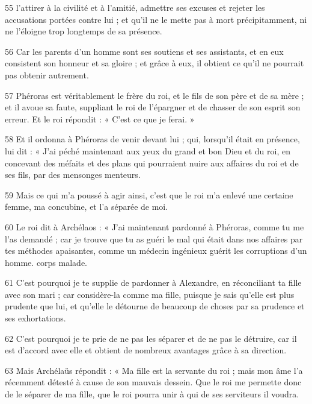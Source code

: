 \par 55 l'attirer à la civilité et à l'amitié, admettre ses excuses et rejeter les accusations portées contre lui ; et qu'il ne le mette pas à mort précipitamment, ni ne l'éloigne trop longtemps de sa présence.

\par 56 Car les parents d'un homme sont ses soutiens et ses assistants, et en eux consistent son honneur et sa gloire ; et grâce à eux, il obtient ce qu'il ne pourrait pas obtenir autrement.

\par 57 Phéroras est véritablement le frère du roi, et le fils de son père et de sa mère ; et il avoue sa faute, suppliant le roi de l'épargner et de chasser de son esprit son erreur. Et le roi répondit : « C'est ce que je ferai. »

\par 58 Et il ordonna à Phéroras de venir devant lui ; qui, lorsqu'il était en présence, lui dit : « J'ai péché maintenant aux yeux du grand et bon Dieu et du roi, en concevant des méfaits et des plans qui pourraient nuire aux affaires du roi et de ses fils, par des mensonges menteurs.

\par 59 Mais ce qui m'a poussé à agir ainsi, c'est que le roi m'a enlevé une certaine femme, ma concubine, et l'a séparée de moi.

\par 60 Le roi dit à Archélaos : « J'ai maintenant pardonné à Phéroras, comme tu me l'as demandé ; car je trouve que tu as guéri le mal qui était dans nos affaires par tes méthodes apaisantes, comme un médecin ingénieux guérit les corruptions d'un homme. corps malade.

\par 61 C'est pourquoi je te supplie de pardonner à Alexandre, en réconciliant ta fille avec son mari ; car considère-la comme ma fille, puisque je sais qu'elle est plus prudente que lui, et qu'elle le détourne de beaucoup de choses par sa prudence et ses exhortations.

\par 62 C'est pourquoi je te prie de ne pas les séparer et de ne pas le détruire, car il est d'accord avec elle et obtient de nombreux avantages grâce à sa direction.

\par 63 Mais Archélaüs répondit : « Ma fille est la servante du roi ; mais mon âme l'a récemment détesté à cause de son mauvais dessein. Que le roi me permette donc de le séparer de ma fille, que le roi pourra unir à qui de ses serviteurs il voudra.

